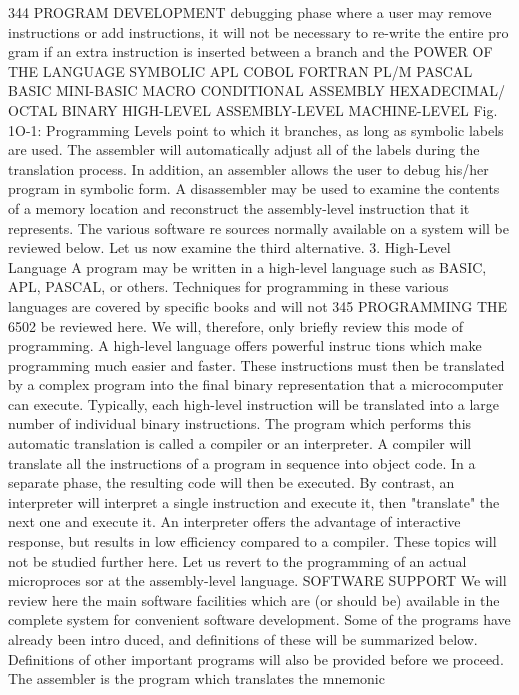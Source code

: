 {{{{{{{{{{{{{{{{{{{{{{{{{{{{{{{{{{{{{{{{{{{{{{{{{{{{{{{{{{{{{{{{{{{{{{{{{{{{{{{{{{{{{{{{{{{{{{{{{{{{{{{{{{{{{{{{{{{{{{{{{{{{{{{{{{{{{{{{{{{{344
PROGRAM DEVELOPMENT
debugging phase where a user may remove instructions or add
instructions, it will not be necessary to re-write the entire pro
gram if an extra instruction is inserted between a branch and the
POWER OF
THE
LANGUAGE
SYMBOLIC
APL
COBOL
FORTRAN
PL/M
PASCAL
BASIC
MINI-BASIC
MACRO
CONDITIONAL
ASSEMBLY
HEXADECIMAL/
OCTAL
BINARY
HIGH-LEVEL
ASSEMBLY-LEVEL
MACHINE-LEVEL
Fig. 1O-1: Programming Levels
point to which it branches, as long as symbolic labels are used.
The assembler will automatically adjust all of the labels during the
translation process. In addition, an assembler allows the user to debug
his/her program in symbolic form. A disassembler may be used to
examine the contents of a memory location and reconstruct the
assembly-level instruction that it represents. The various software re
sources normally available on a system will be reviewed below. Let us
now examine the third alternative.
3. High-Level Language
A program may be written in a high-level language such as
BASIC, APL, PASCAL, or others. Techniques for programming in
these various languages are covered by specific books and will not
345
PROGRAMMING THE 6502
be reviewed here. We will, therefore, only briefly review this mode
of programming. A high-level language offers powerful instruc
tions which make programming much easier and faster. These
instructions must then be translated by a complex program into
the final binary representation that a microcomputer can execute.
Typically, each high-level instruction will be translated into a
large number of individual binary instructions. The program
which performs this automatic translation is called a compiler or
an interpreter. A compiler will translate all the instructions of a
program in sequence into object code. In a separate phase, the
resulting code will then be executed. By contrast, an interpreter
will interpret a single instruction and execute it, then
"translate" the next one and execute it. An interpreter offers the
advantage of interactive response, but results in low efficiency
compared to a compiler. These topics will not be studied further
here. Let us revert to the programming of an actual microproces
sor at the assembly-level language.
SOFTWARE SUPPORT
We will review here the main software facilities which are (or
should be) available in the complete system for convenient
software development. Some of the programs have already been intro
duced, and definitions of these will be summarized below. Definitions
of other important programs will also be provided before we proceed.
The assembler is the program which translates the mnemonic
}}}}}}}}}}}}}}}}}}}}}}}}}}}}}}}}}}}}}}}}}}}}}}}}}}}}}}}}}}}}}}}}}}}}}}}}}}}}}}}}}}}}}}}}}}}}}}}}}}}}}}}}}}}}}}}}}}}}}}}}}}}}}}}}}}}}}}}}}}}}
